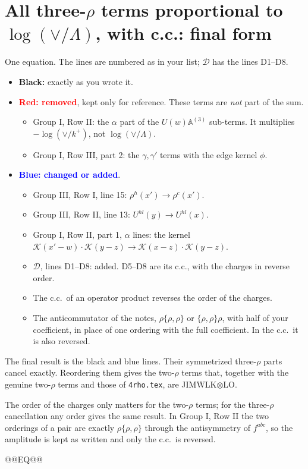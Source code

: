 \documentclass[9pt]{article}
\begin{document}
\section*{All three-$\rho$ terms proportional to $\log(\vee/\Lambda)$, with c.c.: final form}
One equation. The lines are numbered as in your list; $\mathcal D$ has the lines D1--D8.
\begin{itemize}
\item \textbf{Black:} exactly as you wrote it.
\item \textcolor{red}{\textbf{Red: removed}}, kept only for reference. These terms are \emph{not} part of the sum.
\begin{itemize}
\item[F4] Group I, Row II: the $\alpha$ part of the $U(w)\mathbb A^{(3)}$ sub-terms. It multiplies $-\log(\vee/k^+)$, not $\log(\vee/\Lambda)$.
\item[F3] Group I, Row III, part 2: the $\gamma,\gamma'$ terms with the edge kernel $\phi$.
\end{itemize}
\item \textcolor{blue}{\textbf{Blue: changed or added}}.
\begin{itemize}
\item[T1] Group III, Row I, line 15: $\rho^{h}(x')\to\rho^{c}(x')$.
\item[T2] Group III, Row II, line 13: $U^{hl}(y)\to U^{hl}(x)$.
\item[T3] Group I, Row II, part 1, $\alpha$ lines: the kernel $\mathcal K(x'-w)\cdot\mathcal K(y-z)\to\mathcal K(x-z)\cdot\mathcal K(y-z)$.
\item[F3] $\mathcal D$, lines D1--D8: added. D5--D8 are its c.c., with the charges in reverse order.
\item[c.c.] The c.c.\ of an operator product reverses the order of the charges.
\item[order] The anticommutator of the notes, $\rho\{\rho,\rho\}$ or $\{\rho,\rho\}\rho$, with half of your coefficient, in place of one ordering with the full coefficient. In the c.c.\ it is also reversed.
\end{itemize}
\end{itemize}
The final result is the black and blue lines. Their symmetrized three-$\rho$ parts cancel exactly. Reordering them gives the two-$\rho$ terms that, together with the genuine two-$\rho$ terms and those of \texttt{4rho.tex}, are JIMWLK$\otimes$LO.

The order of the charges only matters for the two-$\rho$ terms; for the three-$\rho$ cancellation any order gives the same result. In Group I, Row II the two orderings of a pair are exactly $\rho\{\rho,\rho\}$ through the antisymmetry of $f^{abc}$, so the amplitude is kept as written and only the c.c.\ is reversed.

@@EQ@@
\end{document}
